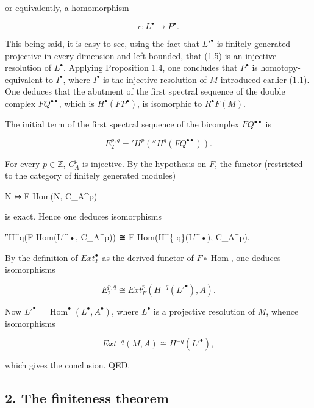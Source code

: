 \documentclass[
]{article}
\newenvironment{Shaded}{}{}
\newcommand{\NormalTok}[1]{#1}
\begin{document}
or equivalently, a homomorphism

\[
c : L^{\bullet} \to P^{\bullet}.
\]

This being said, it is easy to see, using the fact that \(L'^{\bullet}\)
is finitely generated projective in every dimension and left-bounded,
that (1.5) is an injective resolution of \(L^{\bullet}\). Applying
Proposition 1.4, one concludes that \(P^{\bullet}\) is
homotopy-equivalent to \(I^{\bullet}\), where \(I^{\bullet}\) is the
injective resolution of \(M\) introduced earlier (1.1). One deduces that
the abutment of the first spectral sequence of the double complex
\(F Q^{\bullet\bullet}\), which is \(H^{\bullet}(F P^{\bullet})\), is
isomorphic to \(R^{\bullet} F(M)\).

The initial term of the first spectral sequence of the bicomplex
\(F Q^{\bullet\bullet}\) is

\[
E^{p,q}_{2} = 'H^{p}(''H^{q}(F Q^{\bullet\bullet})).
\]

For every \(p \in \mathbb{Z}\), \(C^{p}_{A}\) is injective. By the
hypothesis on \(F\), the functor (restricted to the category of finitely
generated modules)

\begin{Shaded}
\begin{Highlighting}[]
\NormalTok{N ↦ F Hom(N, C\_A\^{}p)}
\end{Highlighting}
\end{Shaded}

is exact. Hence one deduces isomorphisms

\begin{Shaded}
\begin{Highlighting}[]
\NormalTok{″H\^{}q(F Hom(L′\^{}•, C\_A\^{}p)) ≅ F Hom(H\^{}\{{-}q\}(L′\^{}•), C\_A\^{}p).}
\end{Highlighting}
\end{Shaded}

By the definition of \(Ext^{\bullet}_{F}\) as the derived functor of
\(F \circ \operatorname{Hom}\), one deduces isomorphisms

\[
E^{p,q}_{2} \cong Ext^{p}_{F}(H^{-q}(L'^{\bullet}), A).
\]

Now
\(L'^{\bullet} = \operatorname{Hom}^{\bullet}(L^{\bullet}, A^{\bullet})\),
where \(L^{\bullet}\) is a projective resolution of \(M\), whence
isomorphisms

\[
Ext^{-q}(M, A) \cong H^{-q}(L'^{\bullet}),
\]

which gives the conclusion. QED.

\subsection{2. The finiteness theorem}\label{the-finiteness-theorem}
\end{document}
